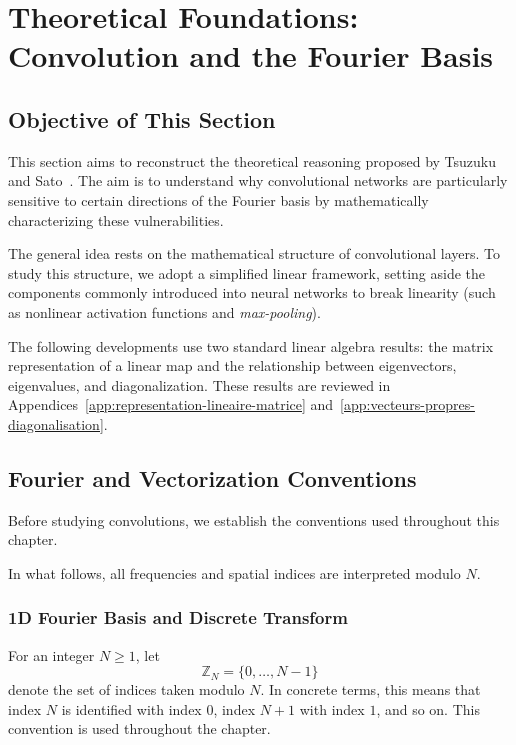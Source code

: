 \chapter[Theoretical Foundations: Convolution and the Fourier Basis]{Theoretical Foundations:\\Convolution and the Fourier Basis}

\section{Objective of This Section}

This section aims to reconstruct the theoretical reasoning proposed by
Tsuzuku and Sato~\cite{tsuzuku2019structural}. The aim is to understand why convolutional networks
are particularly sensitive to certain directions of the Fourier basis by mathematically characterizing
these vulnerabilities.

The general idea rests on the mathematical structure of convolutional layers.
To study this structure, we adopt a simplified linear framework, setting aside the components
commonly introduced into neural networks to break linearity
(such as nonlinear activation functions and \textit{max-pooling}).

The following developments use two standard linear algebra results:
the matrix representation of a linear map and the relationship between eigenvectors,
eigenvalues, and diagonalization. These results are reviewed in Appendices~\ref{app:representation-lineaire-matrice}
and~\ref{app:vecteurs-propres-diagonalisation}.

\section{Fourier and Vectorization Conventions}
\label{sec:conventions-fourier-vectorisation}

Before studying convolutions, we establish the conventions used throughout this chapter.

In what follows, all frequencies and spatial indices are interpreted modulo $N$.

\subsection{1D Fourier Basis and Discrete Transform}

For an integer $N \geq 1$, let
\[
    \mathbb{Z}_N = \{0,\dots,N-1\}
\]
denote the set of indices taken modulo $N$. In concrete terms, this means that index $N$ is identified
with index $0$, index $N+1$ with index $1$, and so on. This convention is used
throughout the chapter.

